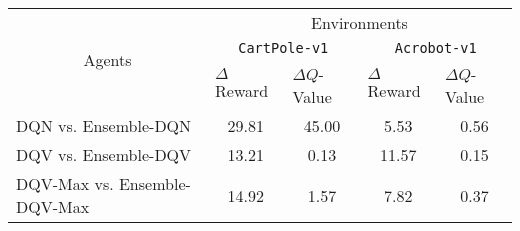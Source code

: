 \documentclass{article}
\begin{document}
\begin{table}
\centering
\setlength{\extrarowheight}{0pt}
\addtolength{\extrarowheight}{\aboverulesep}
\addtolength{\extrarowheight}{\belowrulesep}
\setlength{\aboverulesep}{0pt}
\setlength{\belowrulesep}{0pt}
\begin{tabular}{|l|c|c|c|c|}
\toprule
\multicolumn{1}{c}{\multirow{3}{*}{Agents}} & \multicolumn{4}{c}{Environments}                                                                                                                         \\
\multicolumn{1}{c}{}                        & \multicolumn{2}{c}{\texttt{CartPole-v1}}                                  & \multicolumn{2}{c}{\texttt{Acrobot-v1}}                                      \\
\cmidrule(l){2-5}
\multicolumn{1}{c}{}                        & \multicolumn{1}{l}{$\Delta$Reward} & \multicolumn{1}{l}{$\Delta Q$-Value} & \multicolumn{1}{l}{$\Delta$Reward}   & \multicolumn{1}{l}{$\Delta Q$-Value}  \\
\midrule
DQN vs. Ensemble-DQN                        & 29.81                              & {\cellcolor[rgb]{1,0.988,0.62}}45.00 & {\cellcolor[rgb]{1,0.988,0.62}}5.53  & {\cellcolor[rgb]{1,0.988,0.62}}0.56   \\
\midrule
DQV vs. Ensemble-DQV                        & 13.21                              & 0.13                                 & {\cellcolor[rgb]{1,0.988,0.62}}11.57 & {\cellcolor[rgb]{1,0.988,0.62}}0.15   \\
\midrule
DQV-Max vs. Ensemble-DQV-Max                & 14.92                              & 1.57                                 & {\cellcolor[rgb]{1,0.988,0.62}}7.82  & {\cellcolor[rgb]{1,0.988,0.62}}0.37   \\
\bottomrule
\end{tabular}
\end{table}
\end{document}
